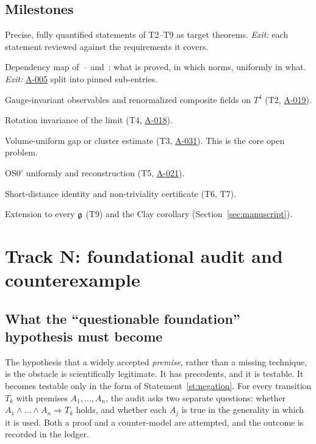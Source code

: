 \documentclass[11pt,a4paper]{article}
\newcommand{\idref}[1]{\hyperref[#1]{\textsf{#1}}}
\begin{document}
\subsection{Milestones}
\begin{description}[font=\normalfont\sffamily,leftmargin=1.1cm,labelwidth=0.9cm,align=left]
\item[P1] Precise, fully quantified statements of T2--T9 as target theorems. \emph{Exit:} each statement reviewed against the requirements it covers.
\item[P2] Dependency map of~\cite{Bal85}--\cite{Bal89b} and~\cite{Dim13a,Dim13b}: what is proved, in which norms, uniformly in what. \emph{Exit:} \idref{A-005} split into pinned sub-entries.
\item[P3] Gauge-invariant observables and renormalized composite fields on $T^4$ (T2, \idref{A-019}).
\item[P4] Rotation invariance of the limit (T4, \idref{A-018}).
\item[P5] Volume-uniform gap or cluster estimate (T3, \idref{A-031}). This is the core open problem.
\item[P6] OS0$'$ uniformly and reconstruction (T5, \idref{A-021}).
\item[P7] Short-distance identity and non-triviality certificate (T6, T7).
\item[P8] Extension to every $\mathfrak g$ (T9) and the Clay corollary (Section~\ref{sec:manuscript}).
\end{description}

\section{Track N: foundational audit and counterexample}\label{sec:negative}

\subsection{What the \enquote{questionable foundation} hypothesis must become}
The hypothesis that a widely accepted \emph{premise}, rather than a missing technique, is the obstacle is scientifically legitimate. It has precedents, and it is testable. It becomes testable only in the form of Statement~\ref{st:negation}. For every transition $T_k$ with premises $A_1,\dots,A_n$, the audit asks two separate questions: whether $A_1\wedge\dots\wedge A_n\Rightarrow T_k$ holds, and whether each $A_j$ is true in the generality in which it is used. Both a proof and a counter-model are attempted, and the outcome is recorded in the ledger.
\end{document}

